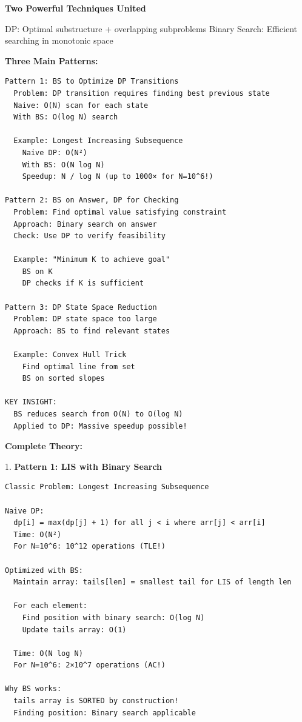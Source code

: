 \documentclass[11pt,a4paper,oneside]{book}
\begin{document}
\begin{tcolorbox}[
    enhanced,breakable,
    colback=white,
    colframe=deepblue,
    boxrule=1.5pt,
    arc=3mm,
    title=\textbf{The BS+DP Synergy}
]
\textbf{Two Powerful Techniques United}

DP: Optimal substructure + overlapping subproblems
Binary Search: Efficient searching in monotonic space

\textbf{Three Main Patterns:}
\begin{verbatim}
Pattern 1: BS to Optimize DP Transitions
  Problem: DP transition requires finding best previous state
  Naive: O(N) scan for each state
  With BS: O(log N) search
  
  Example: Longest Increasing Subsequence
    Naive DP: O(N²)
    With BS: O(N log N)
    Speedup: N / log N (up to 1000× for N=10^6!)

Pattern 2: BS on Answer, DP for Checking
  Problem: Find optimal value satisfying constraint
  Approach: Binary search on answer
  Check: Use DP to verify feasibility
  
  Example: "Minimum K to achieve goal"
    BS on K
    DP checks if K is sufficient

Pattern 3: DP State Space Reduction
  Problem: DP state space too large
  Approach: BS to find relevant states
  
  Example: Convex Hull Trick
    Find optimal line from set
    BS on sorted slopes

KEY INSIGHT:
  BS reduces search from O(N) to O(log N)
  Applied to DP: Massive speedup possible!
\end{verbatim}

\textbf{Complete Theory:}

1. \textbf{Pattern 1: LIS with Binary Search}
\begin{verbatim}
Classic Problem: Longest Increasing Subsequence

Naive DP:
  dp[i] = max(dp[j] + 1) for all j < i where arr[j] < arr[i]
  Time: O(N²)
  For N=10^6: 10^12 operations (TLE!)

Optimized with BS:
  Maintain array: tails[len] = smallest tail for LIS of length len
  
  For each element:
    Find position with binary search: O(log N)
    Update tails array: O(1)
  
  Time: O(N log N)
  For N=10^6: 2×10^7 operations (AC!)

Why BS works:
  tails array is SORTED by construction!
  Finding position: Binary search applicable
  

\end{verbatim}
\end{tcolorbox}
\end{document}
